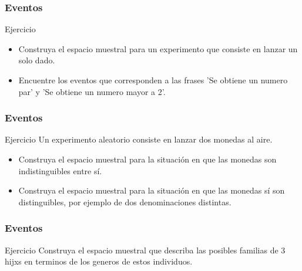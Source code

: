 \documentclass[table]{beamer}
\begin{document}
\begin{frame}
    \frametitle{Eventos}

    \begin{block}{Ejercicio}

\begin{itemize}
\item Construya el espacio muestral para un experimento que consiste en lanzar un solo dado.
\item Encuentre los eventos que corresponden a las frases 'Se obtiene un numero par' y 'Se obtiene un numero mayor a 2'.
\end{itemize}

\end{block}

\end{frame}

\begin{frame}
    \frametitle{Eventos}

    \begin{block}{Ejercicio}
Un experimento aleatorio consiste en lanzar dos monedas al aire.
\begin{itemize}
\item Construya el espacio muestral para la situación en que las monedas son indistinguibles entre sí.
\item Construya el espacio muestral para la situación en que las monedas sí son distinguibles, por ejemplo de dos denominaciones distintas.
\end{itemize}

\end{block}

\end{frame}

\begin{frame}
    \frametitle{Eventos}

    \begin{block}{Ejercicio}
Construya el espacio muestral que describa  las posibles familias de 3 hijxs en terminos de los generos de estos individuos.

\end{block}

\end{frame}

\end{document}

